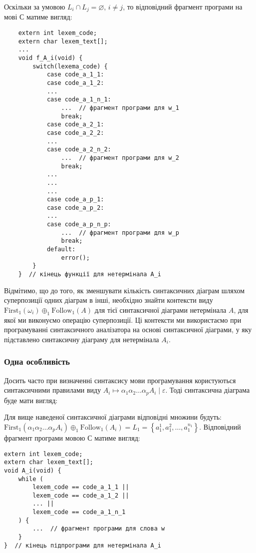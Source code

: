 \begin{itemize}
	Оскільки за умовою $L_i \cap L_j = \varnothing$, $i \ne j$, то відповідний фрагмент програми на мові С матиме вигляд:
	\begin{verbatim}
	extern int lexem_code;
	extern char lexem_text[];
	...
	void f_A_i(void) {
	    switch(lexema_code) {
	        case code_a_1_1:
	        case code_a_1_2:
	        ...
	        case code_a_1_n_1:
	            ...  // фрагмент програми для w_1
	            break;
	        case code_a_2_1:
	        case code_a_2_2:
	        ...
	        case code_a_2_n_2:
	            ...  // фрагмент програми для w_2
	            break;
	        ...
	        ...
	        ...
	        case code_a_p_1:
	        case code_a_p_2:
	        ...
	        case code_a_p_n_p:
	            ...  // фрагмент програми для w_p
	            break;
	        default: 
	            error();
	    }
	}  // кінець функції для нетермінала A_i
	\end{verbatim}
\end{itemize}

Відмітимо, що до того, як зменшувати кількість синтаксичних діаграм шляхом суперпозиції одних діаграм в інші, необхідно знайти контексти виду $\text{First}_1(\omega_i) \oplus_1 \text{Follow}_1(A)$ для тієї синтаксичної діаграми нетермінала $A$, для якої ми виконуємо операцію суперпозиції. Ці контексти ми використаємо при програмуванні синтаксичного аналізатора на основі синтаксичної діаграми, у яку підставлено синтаксичну діаграму для нетермінала $A_i$.

\subsubsection{Одна особливість}

Досить часто при визначенні синтаксису мови програмування користуються синтаксичними правилами виду $A_i \mapsto \alpha_1 \alpha_2 \ldots \alpha_p A_i \mid \varepsilon$. Тоді синтаксична діаграма буде мати вигляд:
\begin{figure}[H]
	\centering
	
\end{figure}

Для вище наведеної синтаксичної діаграми відповідні множини будуть: $\text{First}_1(\alpha_1 \alpha_2 \ldots \alpha_p A_i) \oplus_1 \text{Follow}_1(A_i) = L_1 = \left\{a_1^1, a_1^2, \ldots, a_1^{n_1}\right\}$. Відповідний фрагмент програми мовою С матиме вигляд:
\begin{verbatim}
extern int lexem_code;
extern char lexem_text[];
void A_i(void) {
    while (
        lexem_code == code_a_1_1 ||
        lexem_code == code_a_1_2 ||
        ... ||
        lexem_code == code_a_1_n_1
    ) {
        ...  // фрагмент програми для слова w
    }
}  // кінець підпрограми для нетермінала A_i
\end{verbatim}


